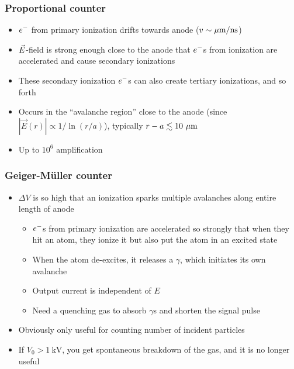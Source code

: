 \subsubsection{Proportional counter}
\begin{itemize}
  \item $e^{-}$ from primary ionization drifts towards anode ($v\sim \mu\text{m}/\text{ns}$)
  \item $\vec{E}$-field is strong enough close to the anode that $e^{-}$s from ionization are accelerated and cause secondary ionizations
  \item These secondary ionization $e^{-}$s can also create tertiary ionizations, and so forth
  \item Occurs in the ``avalanche region'' close to the anode (since $|\vec E(r)|\propto 1/\ln(r/a)$), typically $r-a \lesssim 10~\mu\text{m}$
  \item Up to $10^6$ amplification
\end{itemize}
\subsubsection{Geiger-M\"uller counter}
\begin{itemize}
  \item $\Delta V$ is so high that an ionization sparks multiple avalanches along entire length of anode
  \begin{itemize}
    \item $e^{-}$s from primary ionization are accelerated so strongly that when they hit an atom, they ionize it but also put the atom in an excited state
    \item When the atom de-excites, it releases a $\gamma$, which initiates its own avalanche
    \item Output current is independent of $E$
    \item Need a quenching gas to absorb $\gamma$s and shorten the signal pulse
  \end{itemize}
  \item Obviously only useful for counting number of incident particles
  \item If $V_0 > 1~\text{kV}$, you get spontaneous breakdown of the gas, and it is no longer useful
\end{itemize}

